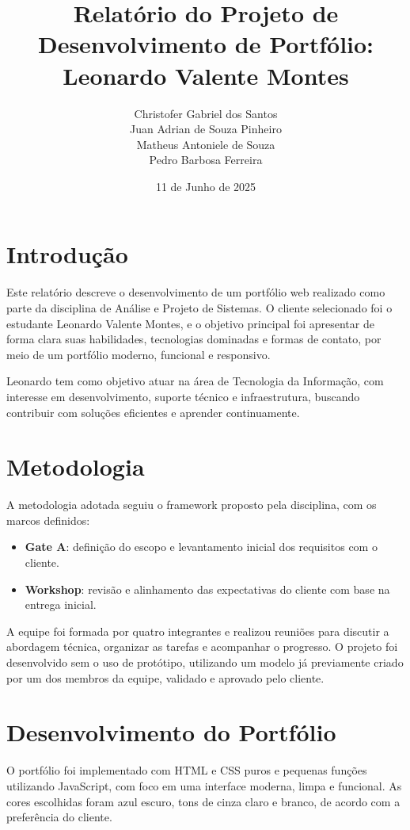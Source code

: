 \documentclass[12pt]{article}
\title{Relatório do Projeto de Desenvolvimento de Portfólio: Leonardo Valente
Montes}
\author{
Christofer Gabriel dos Santos \\
Juan Adrian de Souza Pinheiro \\
Matheus Antoniele de Souza \\
Pedro Barbosa Ferreira
}
\date{11 de Junho de 2025}
\begin{document}
\maketitle

\tableofcontents

\newpage

\section{Introdução}

Este relatório descreve o desenvolvimento de um portfólio web realizado como parte da disciplina de Análise e Projeto de Sistemas. O cliente selecionado foi o estudante Leonardo Valente Montes, e o objetivo principal foi apresentar de forma clara suas habilidades, tecnologias dominadas e formas de contato, por meio de um portfólio moderno, funcional e responsivo.

Leonardo tem como objetivo atuar na área de Tecnologia da Informação, com interesse em desenvolvimento, suporte técnico e infraestrutura, buscando contribuir com soluções eficientes e aprender continuamente.

\section{Metodologia}

A metodologia adotada seguiu o framework proposto pela disciplina, com os marcos definidos:

\begin{itemize}
    \item \textbf{Gate A}: definição do escopo e levantamento inicial dos requisitos com o cliente.
    \item \textbf{Workshop}: revisão e alinhamento das expectativas do cliente com base na entrega inicial.
\end{itemize}

A equipe foi formada por quatro integrantes e realizou reuniões para discutir a abordagem técnica, organizar as tarefas e acompanhar o progresso. O projeto foi desenvolvido sem o uso de protótipo, utilizando um modelo já previamente criado por um dos membros da equipe, validado e aprovado pelo cliente.

\section{Desenvolvimento do Portfólio}

O portfólio foi implementado com HTML e CSS puros e pequenas funções utilizando JavaScript, com foco em uma interface moderna, limpa e funcional. As cores escolhidas foram azul escuro, tons de cinza claro e branco, de acordo com a preferência do cliente.
\end{document}
